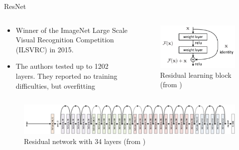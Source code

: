 \documentclass[xcolor=pdftex,dvipsnames,table,mathserif]{beamer}
\begin{document}
\begin{frame}{ResNet}

\begin{columns}
  \begin{column}{.5\textwidth}
\begin{itemize}
  \item Winner of the ImageNet Large Scale Visual Recognition Competition (ILSVRC) in 2015.
  \item The authors tested up to 1202 layers. They reported no training difficulties, but overfitting \cite{he_deep_2015}
\end{itemize}

  \end{column}

  \begin{column}{.5\textwidth}
\begin{figure}[ht]
  \centering
  \includegraphics[width=\textwidth]{resnet_module.png}
  \caption{Residual learning block \tiny{(from \cite{he_deep_2015})}}
\end{figure}

  \end{column}
\end{columns}


\begin{figure}[ht]
  \centering
  \includegraphics[width=\textwidth]{resnet.png}
  \caption{Residual network with 34 layers \tiny{(from \cite{he_deep_2015})} }
\end{figure}


\end{frame}
\end{document}
